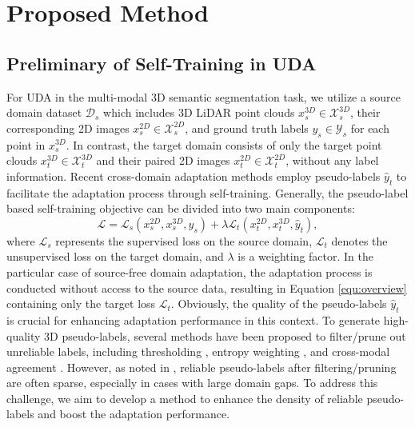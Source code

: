 \section{Proposed Method}

\figStructure

\subsection{Preliminary of Self-Training in UDA}
For UDA in the multi-modal 3D semantic segmentation task, we utilize a source domain dataset $\mathcal{D}_s$ which includes 3D LiDAR point clouds $x_s^{3D} \in \mathcal{X}_s^{3D}$, their corresponding 2D images $x_s^{2D} \in \mathcal{X}_s^{2D}$, and ground truth labels $y_s \in \mathcal{Y}_s$ for each point in $x_s^{3D}$. In contrast, the target domain consists of only the target point clouds $x_t^{3D} \in \mathcal{X}_t^{3D}$ and their paired 2D images $x_t^{2D} \in \mathcal{X}_t^{2D}$, without any label information. Recent cross-domain adaptation methods employ pseudo-labels $\hat{y}_t$ to facilitate the adaptation process through self-training. Generally, the pseudo-label based self-training objective can be divided into two main components: 
\begin{equation}
    \mathcal{L} = \mathcal{L}_s(x^{2D}_s, x^{3D}_s, y_s) + \lambda \mathcal{L}_t(x^{2D}_t, x^{3D}_t, \hat{y}_t),
    \label{equ:overview}
\end{equation}
where $\mathcal{L}_s$ represents the supervised loss on the source domain, $\mathcal{L}_t$ denotes the unsupervised loss on the target domain, and $\lambda$ is a weighting factor. In the particular case of source-free domain adaptation, the adaptation process is conducted without access to the source data, resulting in Equation \ref{equ:overview} containing only the target loss $\mathcal{L}_t$. Obviously, the quality of the pseudo-labels $\hat{y}_t$ is crucial for enhancing adaptation performance in this context. To generate high-quality 3D pseudo-labels, several methods have been proposed to filter/prune out unreliable labels, including thresholding \cite{jaritz2020xmuda}, entropy weighting \cite{shin2022mm}, and cross-modal agreement \cite{shin2022mm, simons2023summit}. However, as noted in \cite{simons2023summit}, reliable pseudo-labels after filtering/pruning are often sparse, especially in cases with large domain gaps. To address this challenge, we aim to develop a method to enhance the density of reliable pseudo-labels and boost the adaptation performance.

